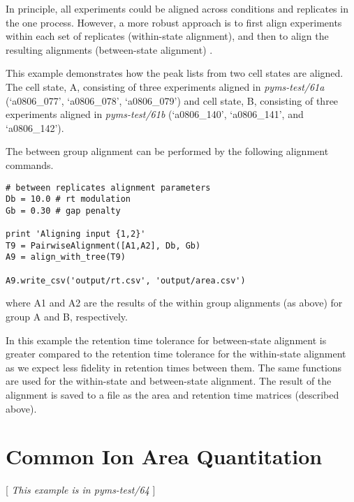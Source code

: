 In principle, all experiments could be aligned across conditions and
replicates in the one process. However, a more robust approach is to first align
experiments within each set of replicates (within-state
alignment), and then to align the resulting alignments (between-state
alignment) \cite{Robinson07}.

This example demonstrates how the peak lists from two cell states are
aligned. The cell state, A, consisting of three experiments aligned in {\em
pyms-test/61a} (`a0806\_077', `a0806\_078', `a0806\_079') and cell state,
B, consisting of three experiments aligned in {\em pyms-test/61b} (`a0806\_140',
`a0806\_141', and `a0806\_142').

The between group alignment can be performed by the following alignment
commands.

\begin{verbatim}
# between replicates alignment parameters
Db = 10.0 # rt modulation
Gb = 0.30 # gap penalty

print 'Aligning input {1,2}'
T9 = PairwiseAlignment([A1,A2], Db, Gb)
A9 = align_with_tree(T9)

A9.write_csv('output/rt.csv', 'output/area.csv')
\end{verbatim}

\noindent
where A1 and A2 are the results of the within group alignments (as above) for
group A and B, respectively.

In this example the retention time tolerance for between-state alignment is
greater compared to the retention time tolerance for the within-state alignment
as we expect less fidelity in retention times between them.  The same functions
are used for the within-state and between-state alignment. The result of the
alignment is saved to a file as the area and retention time matrices (described
above).

%

\section{Common Ion Area Quantitation}
[ {\em This example is in pyms-test/64 } ]
\label{sec:common-ion}

